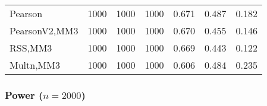 \documentclass[
]{article}
\begin{document}
\begin{table}[H]
{\begin{tabular}[t]{lrrrrrr}
\hspace{1em}Pearson & 1000 & 1000 & 1000 & 0.671 & 0.487 & 0.182\\
\hspace{1em}PearsonV2,MM3 & 1000 & 1000 & 1000 & 0.670 & 0.455 & 0.146\\
\hspace{1em}RSS,MM3 & 1000 & 1000 & 1000 & 0.669 & 0.443 & 0.122\\
\hspace{1em}Multn,MM3 & 1000 & 1000 & 1000 & 0.606 & 0.484 & 0.235\\
\bottomrule
\end{tabular}}
\end{table}

\hypertarget{power-n2000-3}{%
\subsubsection{\texorpdfstring{Power
(\(n=2000\))}{Power (n=2000)}}\label{power-n2000-3}}
\end{document}
